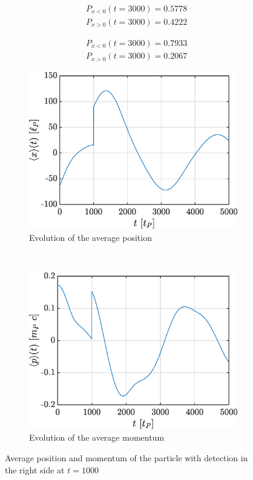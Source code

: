 \documentclass[a4paper,12pt,twoside]{article}
\begin{document}
\begin{align}
 &P_{x<0}(t=3000)=0.5778\\
 &P_{x>0}(t=3000)=0.4222
 \label{eq:p3000_neg}
\end{align}

\begin{align}
 &P_{x<0}(t=3000)=0.7933\\
 &P_{x>0}(t=3000)=0.2067
 \label{eq:p3000_det}
\end{align}

\begin{figure}[h]
        \centering
        \begin{subfigure}[t]{0.45\textwidth}
          \includegraphics[width=\textwidth]{graphs/iv_det_xmoy.eps}
          \caption{Evolution of the average position}
          \label{fig:iv_det_xmoy}
        \end{subfigure}
        ~
        \begin{subfigure}[t]{0.45\textwidth}
          \includegraphics[width=\textwidth]{graphs/iv_det_pmoy.eps}
          \caption{Evolution of the average momentum}
          \label{fig:iv_det_pmoy}
        \end{subfigure}
        \caption{Average position and momentum of the particle with detection in the right side at $t=1000$}
        \label{fig:iv_det_xp}
\end{figure}
\end{document}
